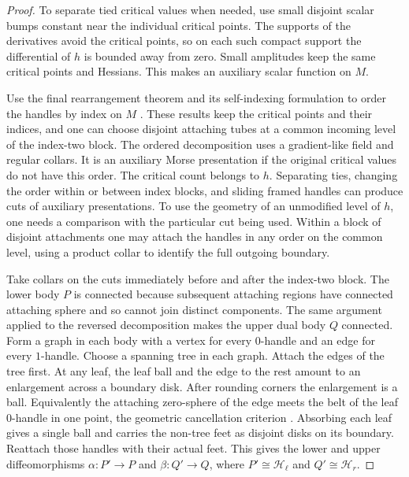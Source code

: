 \documentclass[11pt,letterpaper]{article}
\numberwithin{equation}{section}
\newcommand{\HB}[1]{\mathcal H_{#1}}
\begin{document}
\begin{proof}
To separate tied critical values when needed, use small disjoint
scalar bumps constant near the individual critical points. The
supports of the derivatives avoid the critical points, so on each
such compact support the differential of \(h\) is bounded away
from zero. Small amplitudes keep the same critical points and
Hessians. This makes an auxiliary scalar function on \(M\).

Use the final rearrangement theorem and its self-indexing formulation
to order the handles by index on \(M\)
\cite[Theorems 4.7--4.8]{Milnor1965HCobordism}. These results keep the critical
points and their indices, and one can choose disjoint attaching tubes
at a common incoming level of the index-two block. The ordered
decomposition uses a gradient-like field and regular collars. It is
an auxiliary Morse presentation if the original critical values do
not have this order. The critical count belongs to \(h\). Separating
ties, changing the order within or between index blocks, and sliding
framed handles can produce cuts of auxiliary presentations. To use
the geometry of an unmodified level of \(h\), one needs a comparison
with the particular cut being used. Within a block of disjoint
attachments one may attach the handles in any order on the common
level, using a product collar to identify the full outgoing boundary.

Take collars on the cuts immediately before and after the index-two
block. The lower body \(P\) is connected because subsequent
attaching regions have connected attaching sphere and so cannot join
distinct components. The same argument applied to the reversed
decomposition makes the upper dual body \(Q\) connected. Form a graph
in each body with a vertex for every \(0\)-handle and an edge for
every \(1\)-handle. Choose a spanning tree in each graph. Attach
the edges of the tree first. At any leaf, the leaf ball and the
edge to the rest amount to an enlargement across a boundary disk.
After rounding corners the enlargement is a ball. Equivalently the
attaching zero-sphere of the edge meets the belt of the leaf
\(0\)-handle in one point, the geometric cancellation criterion
\cite[Theorem~5.4]{Milnor1965HCobordism}.
Absorbing each leaf gives a single ball and carries the non-tree
feet as disjoint disks on its boundary. Reattach those handles with
their actual feet. This gives the lower and upper
diffeomorphisms \(\alpha:P'\to P\) and \(\beta:Q'\to Q\), where
\(P'\cong\HB{\ell}\) and \(Q'\cong\HB{r}\).


\end{proof}
\end{document}
